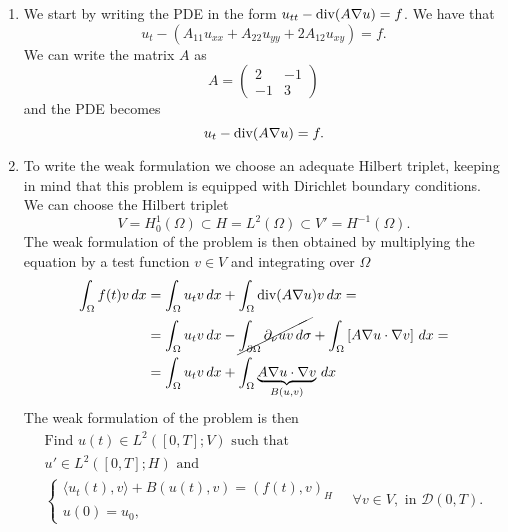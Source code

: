 \begin{enumerate}
    \item We start by writing the PDE in the form \(u_{tt} - \text{div}(A \nabla u) = f\). We
          have that
          \[
              u_{t} - \left(A_{11} u_{xx} + A_{22} u_{yy} + 2A_{12} u_{xy}\right) = f.
          \]
          We can write the matrix \(A\) as
          \[
              A = \begin{pmatrix}
                  2  & -1 \\
                  -1 & 3
              \end{pmatrix}
          \]
          and the PDE becomes
          \[
              u_{t} - \text{div} (A \nabla u) = f.
          \]
    \item To write the weak formulation we choose an adequate Hilbert triplet, keeping in
          mind that this problem is equipped with Dirichlet boundary conditions. We can
          choose the Hilbert triplet
          \[
              V = H^1_0(\Omega) \subset H = L^2(\Omega) \subset V' = H^{-1}(\Omega).
          \]
          The weak formulation of the problem is then obtained by multiplying the
          equation by a test function \(v \in V\) and integrating over \(\Omega\)
          \begin{align*}
              \int_\Omega f(t) v \, dx & = \int_\Omega u_{t} v \, dx + \int_\Omega \text{div}(A \nabla u)v \, dx =                                                                                  \\
                                       & = \int_\Omega u_{t} v \, dx - \cancel{\int_{\partial\Omega} \partial_\nu u v \, d\sigma} + \int_\Omega \left[A \nabla u \cdot \nabla v\right] \, dx = \\
                                       & = \int_\Omega u_{t} v \, dx + \int_\Omega \underbrace{A \nabla u \cdot \nabla v}_{B(u, v)} \, dx
          \end{align*}
          The weak formulation of the problem is then
          \[
              \begin{split}
                  \text{Find } u(t) \in L^2([0, T]; V) \text{ such that } \\
                  u' \in L^2([0, T];H)\text{ and }                        \\
                  \begin{cases}
                      \langle u_{t}(t), v \rangle + B(u(t), v) = (f(t), v)_H \\
                      u(0) = u_0,
                  \end{cases}\quad \forall v \in V, \text{ in } \mathcal{D}(0, T).

\end{split}\]
\end{enumerate}
